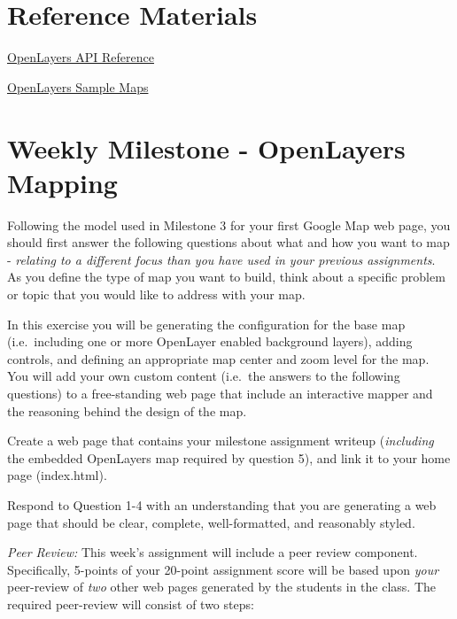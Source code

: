 \documentclass[]{book}
\begin{document}
\section{Reference Materials}\label{week10-reference}

\href{http://openlayers.org/en/v3.14.2/apidoc/}{OpenLayers API
Reference}

\href{http://openlayers.org/en/v3.2.1/examples/}{OpenLayers Sample Maps}

\section{Weekly Milestone - OpenLayers Mapping}\label{week10-milestone}

Following the model used in Milestone 3 for your first Google Map web
page, you should first answer the following questions about what and how
you want to map - \emph{relating to a different focus than you have used
in your previous assignments}. As you define the type of map you want to
build, think about a specific problem or topic that you would like to
address with your map.

In this exercise you will be generating the configuration for the base
map (i.e.~including one or more OpenLayer enabled background layers),
adding controls, and defining an appropriate map center and zoom level
for the map. You will add your own custom content (i.e.~the answers to
the following questions) to a free-standing web page that include an
interactive mapper and the reasoning behind the design of the map.

Create a web page that contains your milestone assignment writeup
(\emph{including} the embedded OpenLayers map required by question 5),
and link it to your home page (index.html).

Respond to Question 1-4 with an understanding that you are generating a
web page that should be clear, complete, well-formatted, and reasonably
styled.

\emph{Peer Review:} This week's assignment will include a peer review
component. Specifically, 5-points of your 20-point assignment score will
be based upon \emph{your} peer-review of \emph{two} other web pages
generated by the students in the class. The required peer-review will
consist of two steps:
\end{document}
